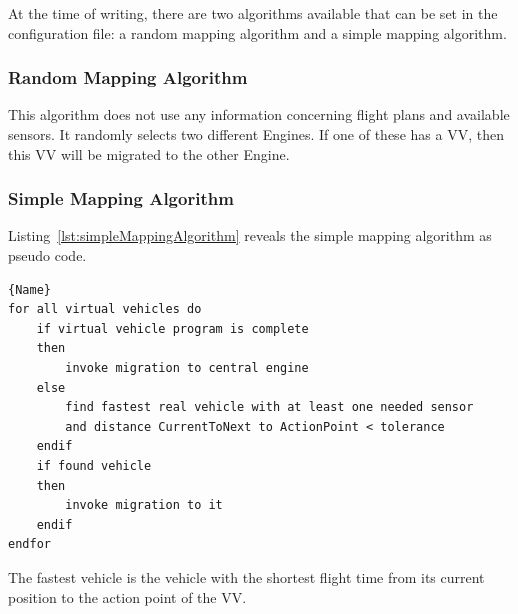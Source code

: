 At the time of writing, there are two algorithms available that can be set in the configuration file: a random
mapping algorithm and a simple mapping algorithm.

\subsubsection{Random Mapping Algorithm}
This algorithm does not use any information concerning flight plans and available sensors.
It randomly selects two different Engines. If one of these has a \ac{VV}, then this \ac{VV} will be
migrated to the other Engine.

\subsubsection{Simple Mapping Algorithm}

Listing~\ref{lst:simpleMappingAlgorithm} reveals the simple mapping algorithm as pseudo code. 

\lstset{tabsize=3,language=PseudoCode}
\begin{lstlisting}[caption={Simple Mapping Algorithm},mathescape=true,label=lst:simpleMappingAlgorithm]{Name}
for all virtual vehicles do
	if virtual vehicle program is complete
	then
		invoke migration to central engine
	else
		find fastest real vehicle with at least one needed sensor
		and distance CurrentToNext to ActionPoint < tolerance
	endif
	if found vehicle 
	then 
		invoke migration to it 
	endif
endfor
\end{lstlisting}

The fastest vehicle is the vehicle with the shortest flight time from its current position to the action
point of the \ac{VV}.


